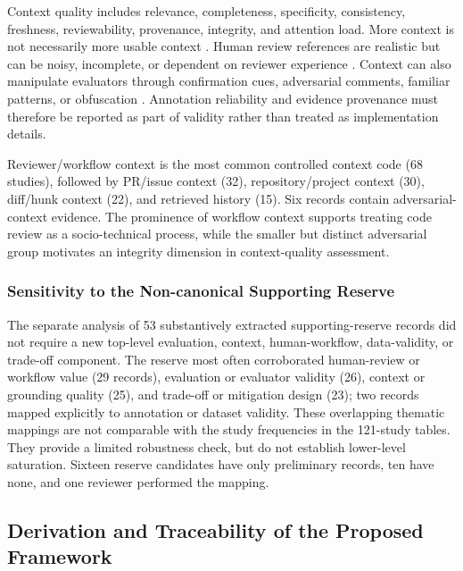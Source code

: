 \documentclass[10pt]{article}
\begin{document}
Context quality includes relevance, completeness, specificity, consistency, freshness, reviewability, provenance, integrity, and attention load. More context is not necessarily more usable context \cite{p04_kumar2026_swe_prbench,p06_hu2025_contextcrbench,p16_icoz2026_context_aware}. Human review references are realistic but can be noisy, incomplete, or dependent on reviewer experience \cite{p08_liu2025_too_noisy,p18_bensghaier2025_curated_reviews,p23_lin2026_reviewer_experience}. Context can also manipulate evaluators through confirmation cues, adversarial comments, familiar patterns, or obfuscation \cite{p63_mitropoulos2026_confirmation_bias,p64_thornton2026_adversarial_comments,p67_bernstein2025_trust_me_function,p68_li2025_cotdeceptor}. Annotation reliability and evidence provenance must therefore be reported as part of validity rather than treated as implementation details.

Reviewer/workflow context is the most common controlled context code (68 studies), followed by PR/issue context (32), repository/project context (30), diff/hunk context (22), and retrieved history (15). Six records contain adversarial-context evidence. The prominence of workflow context supports treating code review as a socio-technical process, while the smaller but distinct adversarial group motivates an integrity dimension in context-quality assessment.

\subsubsection{Sensitivity to the Non-canonical Supporting Reserve}

The separate analysis of 53 substantively extracted supporting-reserve records did not require a new top-level evaluation, context, human-workflow, data-validity, or trade-off component. The reserve most often corroborated human-review or workflow value (29 records), evaluation or evaluator validity (26), context or grounding quality (25), and trade-off or mitigation design (23); two records mapped explicitly to annotation or dataset validity. These overlapping thematic mappings are not comparable with the study frequencies in the 121-study tables. They provide a limited robustness check, but do not establish lower-level saturation. Sixteen reserve candidates have only preliminary records, ten have none, and one reviewer performed the mapping.

\subsection{Derivation and Traceability of the Proposed Framework}
\end{document}
